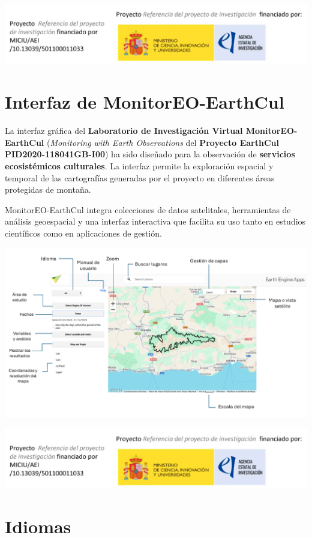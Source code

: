\documentclass[
]{book}
\begin{document}
\includegraphics{assets/logo.jpeg}

\chapter{Interfaz de MonitorEO-EarthCul}\label{interfaz}

La interfaz gráfica del \textbf{Laboratorio de Investigación Virtual MonitorEO-EarthCul} (\emph{Monitoring with Earth Observations} del \textbf{Proyecto EarthCul PID2020-118041GB-I00}) ha sido diseñado para la observación de \textbf{servicios ecosistémicos culturales}. La interfaz permite la exploración espacial y temporal de las cartografías generadas por el proyecto en diferentes áreas protegidas de montaña.

MonitorEO-EarthCul integra colecciones de datos satelitales, herramientas de análisis geoespacial y una interfaz interactiva que facilita su uso tanto en estudios científicos como en aplicaciones de gestión.

\includegraphics{assets/InterfazMonitorEO_es.png}

\includegraphics{assets/logo.jpeg}

\chapter{Idiomas}\label{idiomas}
\end{document}
